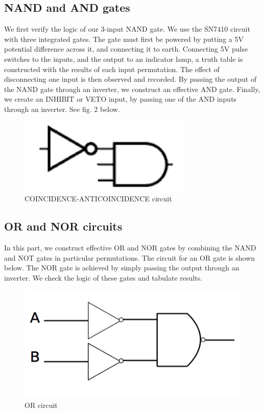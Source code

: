 \documentclass{article}
\begin{document}
\subsection*{NAND and AND gates}
We first verify the logic of our 3-input NAND gate. We use the SN7410 circuit with three integrated gates. The gate must first be powered by putting a 5V potential difference across it, and connecting it to earth. Connecting 5V pulse switches to the inputs, and the output to an indicator lamp, a truth table is constructed with the results of each input permutation. The effect of disconnecting one input is then observed and recorded. By passing the output of the NAND gate through an inverter, we construct an effective AND gate. Finally, we create an INHIBIT or VETO input, by passing one of the AND inputs through an inverter. See fig. 2 below. 

\begin{figure}[h]
    \centering
    \includegraphics[scale = 0.35]{veto}
    \caption{COINCIDENCE-ANTICOINCIDENCE circuit}
    \label{fig:2}
\end{figure}

\subsection*{OR and NOR circuits}
In this part, we construct effective OR and NOR gates by combining the NAND and NOT gates in particular permutations. The circuit for an OR gate is shown below. The NOR gate is achieved by simply passing the output through an inverter. We check the logic of these gates and tabulate results.

\begin{figure}[h]
    \centering
    \includegraphics[scale = 0.35]{OR}
    \caption{OR circuit}
    \label{fig:3}
\end{figure}
\end{document}

